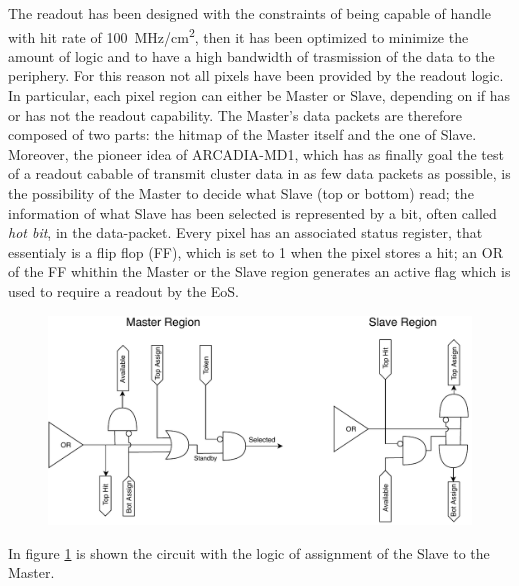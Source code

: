         The readout has been designed with the constraints of being capable of handle with hit rate of \SI{100}{MHz/cm\squared}, then it has been optimized to minimize the amount of logic and to have a high bandwidth of trasmission of the data to the periphery. For this reason not all pixels have been provided by the readout logic.
        In particular, each pixel region can either be Master or Slave, depending on if has or has not the readout capability. 
        The Master's data packets are therefore composed of two parts: the hitmap of the Master itself and the one of Slave. 
        Moreover, the pioneer idea of ARCADIA-MD1, which has as finally goal the test of a readout cabable of transmit cluster data in as few data packets as possible, is the possibility of the Master to decide what Slave (top or bottom) read; the information of what Slave has been selected is represented by a bit, often called \emph{hot bit}, in the data-packet.
        Every pixel has an associated status register, that essentialy is a flip flop (FF), which is set to 1 when the pixel stores a hit; an OR of the FF whithin the Master or the Slave region generates an active flag which is used to require a readout by the EoS.  
        \begin{figure}[h!]
            \centering
            \includegraphics[width=.95\linewidth]{figures/ARCADIA/clustering_logic.pdf}
            \caption{}
            \label{fig:clustering_logic}
        \end{figure}
        In figure \ref{fig:clustering_logic} is shown the circuit with the logic of assignment of the Slave to the Master.
        

